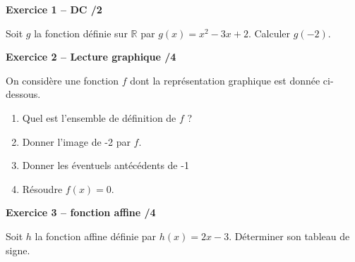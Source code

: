\documentclass[10pt,a4paper]{article}
\begin{document}

\begin{sujets}


\textbf{Exercice 1 -- DC \hfill /2}

Soit \(g\) la fonction définie sur \(\mathbb{R}\) par \(g(x)=x^2-3x+2\). Calculer \(g(-2)\).

\vspace{0.1cm}

\textbf{Exercice 2 -- Lecture graphique \hfill /4}

On considère une fonction \(f\) dont la représentation graphique est donnée ci-dessous.
\begin{enumerate}
\item Quel est l'ensemble de définition de \(f\) ?
\item Donner l'image de -2 par \(f\).
\item Donner les éventuels antécédents de -1
\item Résoudre \(f(x)=0\).
\end{enumerate}

\begin{center}
\end{center}

\textbf{Exercice 3 -- fonction affine \hfill /4}

Soit \(h\) la fonction affine définie par \(h(x)=2x-3\). Déterminer son tableau de signe.

\columnbreak



\end{sujets}
\end{document}
